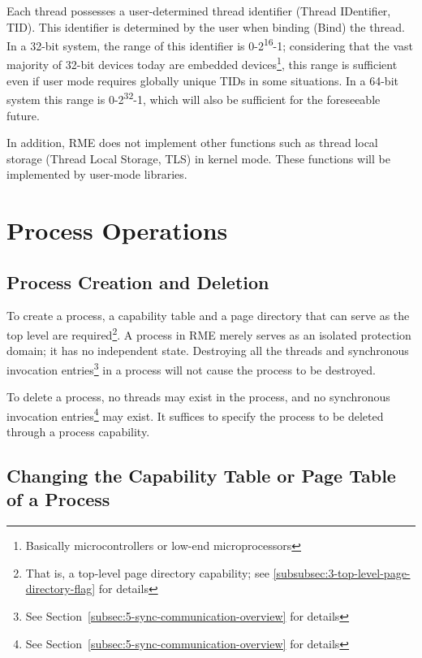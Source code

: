 Each thread possesses a user-determined thread identifier (Thread
IDentifier, TID). This identifier is determined by the user when binding (Bind) the thread. In a 32-bit system, the range of this identifier is 0-2\textsuperscript{16}-1; considering that the vast majority of 32-bit devices today are embedded devices\footnote{Basically microcontrollers or low-end microprocessors}, this range is sufficient even if user mode requires globally unique TIDs in some situations. In a 64-bit system this range is 0-2\textsuperscript{32}-1, which will also be sufficient for the foreseeable future.

In addition, RME does not implement other functions such as thread local storage (Thread Local
Storage, TLS) in kernel mode. These functions will be implemented by user-mode libraries.

\section{Process Operations}\label{sec:4-process-operations}

\subsection{Process Creation and Deletion}\label{subsec:4-process-creation-and-deletion}

To create a process, a capability table and a page directory that can serve as the top level are required\footnote{That is, a top-level page directory capability; see \ref{subsubsec:3-top-level-page-directory-flag} for details}. A process in RME merely serves as an isolated protection domain; it has no independent state. Destroying all the threads and synchronous invocation entries\footnote{See Section~\ref{subsec:5-sync-communication-overview} for details} in a process will not cause the process to be destroyed.

To delete a process, no threads may exist in the process, and no synchronous invocation entries\footnote{See Section~\ref{subsec:5-sync-communication-overview} for details} may exist. It suffices to specify the process to be deleted through a process capability.

\subsection{Changing the Capability Table or Page Table of a Process}\label{subsec:4-change-process-capability-table-or-page-table}


